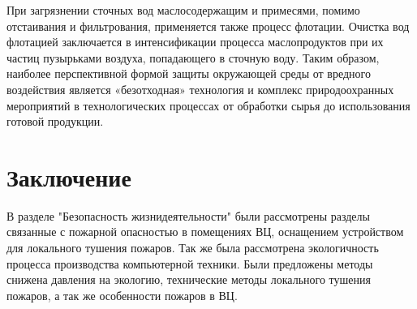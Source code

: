 При загрязнении сточных вод маслосодержащим и примесями, помимо отстаивания и фильтрования, применяется также
процесс флотации. Очистка вод флотацией заключается в интенсификации процесса маслопродуктов при их частиц
пузырьками воздуха, попадающего в сточную воду. Таким образом, наиболее перспективной формой защиты окружающей
среды от вредного воздействия является «безотходная» технология и комплекс природоохранных мероприятий в
технологических процессах от обработки сырья до использования готовой продукции.

\newpage

\section*{Заключение}
В разделе "Безопасность жизнидеятельности" были рассмотрены разделы связанные с пожарной опасностью в помещениях ВЦ,
оснащением устройством для локального тушения пожаров. Так же была рассмотрена экологичность процесса производства 
компьютерной техники. Были предложены методы снижена давления на экологию, технические методы локального
тушения пожаров, а так же особенности пожаров в ВЦ.

\newpage
